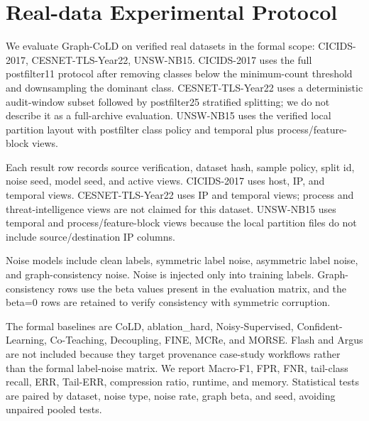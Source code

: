 \section{Real-data Experimental Protocol}
We evaluate Graph-CoLD on verified real datasets in the formal scope: CICIDS-2017, CESNET-TLS-Year22, UNSW-NB15. CICIDS-2017 uses the full postfilter11 protocol after removing classes below the minimum-count threshold and downsampling the dominant class. CESNET-TLS-Year22 uses a deterministic audit-window subset followed by postfilter25 stratified splitting; we do not describe it as a full-archive evaluation. UNSW-NB15 uses the verified local partition layout with postfilter class policy and temporal plus process/feature-block views.

Each result row records source verification, dataset hash, sample policy, split id, noise seed, model seed, and active views. CICIDS-2017 uses host, IP, and temporal views. CESNET-TLS-Year22 uses IP and temporal views; process and threat-intelligence views are not claimed for this dataset. UNSW-NB15 uses temporal and process/feature-block views because the local partition files do not include source/destination IP columns.

Noise models include clean labels, symmetric label noise, asymmetric label noise, and graph-consistency noise. Noise is injected only into training labels. Graph-consistency rows use the beta values present in the evaluation matrix, and the beta=0 rows are retained to verify consistency with symmetric corruption.

The formal baselines are CoLD, ablation_hard, Noisy-Supervised, Confident-Learning, Co-Teaching, Decoupling, FINE, MCRe, and MORSE. Flash and Argus are not included because they target provenance case-study workflows rather than the formal label-noise matrix. We report Macro-F1, FPR, FNR, tail-class recall, ERR, Tail-ERR, compression ratio, runtime, and memory. Statistical tests are paired by dataset, noise type, noise rate, graph beta, and seed, avoiding unpaired pooled tests.
